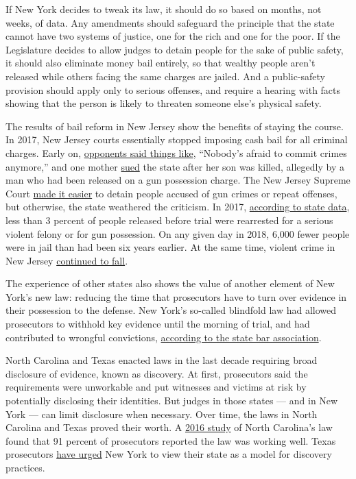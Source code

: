 If New York decides to tweak its law, it should do so based on months,
not weeks, of data. Any amendments should safeguard the principle that
the state cannot have two systems of justice, one for the rich and one
for the poor. If the Legislature decides to allow judges to detain
people for the sake of public safety, it should also eliminate money
bail entirely, so that wealthy people aren't released while others
facing the same charges are jailed. And a public-safety provision should
apply only to serious offenses, and require a hearing with facts showing
that the person is likely to threaten someone else's physical safety.

The results of bail reform in New Jersey show the benefits of staying
the course. In 2017, New Jersey courts essentially stopped imposing cash
bail for all criminal charges. Early on,
\href{https://www.nbcnewyork.com/news/local/bail-reform-new-jersey-criminals-streets-law-jail-investigation/141250/}{opponents
said things like}, ``Nobody's afraid to commit crimes anymore,'' and one
mother
\href{https://www.courthousenews.com/murder-victims-mother-sues-chris-christie-nj-bail-reform/}{sued}
the state after her son was killed, allegedly by a man who had been
released on a gun possession charge. The New Jersey Supreme Court
\href{https://www.nj.com/politics/2017/05/nj_supreme_court_tightens_bail_reform_rules_for_gu.html}{made
it easier} to detain people accused of gun crimes or repeat offenses,
but otherwise, the state weathered the criticism. In 2017,
\href{https://njcourts.gov/courts/assets/criminal/2018cjrannual.pdf?c=ZZI}{according
to state data}, less than 3 percent of people released before trial were
rearrested for a serious violent felony or for gun possession. On any
given day in 2018, 6,000 fewer people were in jail than had been six
years earlier. At the same time, violent crime in New Jersey
\href{https://www.americashealthrankings.org/explore/annual/measure/Crime/state/NJ}{continued
to fall}.

The experience of other states also shows the value of another element
of New York's new law: reducing the time that prosecutors have to turn
over evidence in their possession to the defense. New York's so-called
blindfold law had allowed prosecutors to withhold key evidence until the
morning of trial, and had contributed to wrongful convictions,
\href{https://www.nysba.org/Journal/2019/May/New_York_Removes_the_Blindfold/}{according
to the state bar association}.

North Carolina and Texas enacted laws in the last decade requiring broad
disclosure of evidence, known as discovery. At first, prosecutors said
the requirements were unworkable and put witnesses and victims at risk
by potentially disclosing their identities. But judges in those states
--- and in New York --- can limit disclosure when necessary. Over time,
the laws in North Carolina and Texas proved their worth. A
\href{https://scholarlycommons.law.wlu.edu/wlulr-online/vol73/iss1/20/}{2016
study} of North Carolina's law found that 91 percent of prosecutors
reported the law was working well. Texas prosecutors
\href{https://citylimits.org/2019/02/18/opinion-texas-paves-the-way-for-ny-to-make-criminal-justice-more-fair/}{have
urged} New York to view their state as a model for discovery practices.

